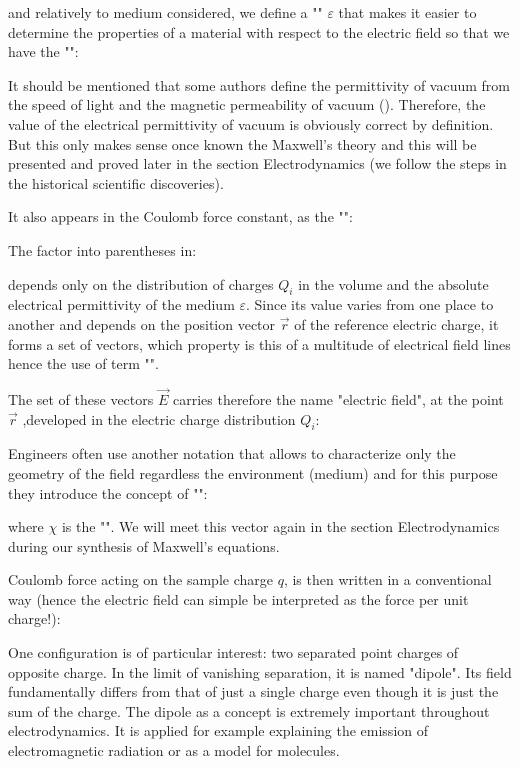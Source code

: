 	and relatively to medium considered, we define a "" $\varepsilon$ that makes it easier to determine the properties of a material with respect to the electric field so that we have the "":
	
	It should be mentioned that some authors define the permittivity of vacuum from the speed of light and the magnetic permeability of vacuum (). Therefore, the value of the electrical permittivity of vacuum is obviously correct by definition. But this only makes sense once known the Maxwell's theory and this will be presented and proved later in the section Electrodynamics (we follow the steps in the historical scientific discoveries).
	
	 It also appears in the Coulomb force constant, as the "":
	  
	The factor into parentheses in:
	
	depends only on the distribution of charges $Q_i$ in the volume and the absolute electrical permittivity of the medium $\varepsilon$. Since its value varies from one place to another and depends on the position vector $\vec{r}$ of the reference electric charge, it forms a set of vectors, which property is this of a multitude of electrical field lines hence the use of term "".
	
	The set of these vectors $\vec{E}$ carries therefore the name "electric field", at the point $\vec{r}$ ,developed in the electric charge distribution $Q_i$:
	
	Engineers often use another notation that allows to characterize only the geometry of the field regardless the environment (medium) and for this purpose they introduce the concept of "":
	
	where $\chi$ is the "". We will meet this vector again in the section Electrodynamics during our synthesis of Maxwell's equations.
	
	Coulomb force acting on the sample charge $q$, is then written in a conventional way (hence the electric field can simple be interpreted as the force per unit charge!):
	
	One configuration is of particular interest: two separated point charges of opposite charge. In the limit of vanishing separation, it is named "dipole". Its field fundamentally differs from that of just a single charge even though it is just the sum of the charge. The dipole as a concept is extremely important throughout electrodynamics. It is applied for example explaining the emission of electromagnetic radiation or as a model for molecules.
	
